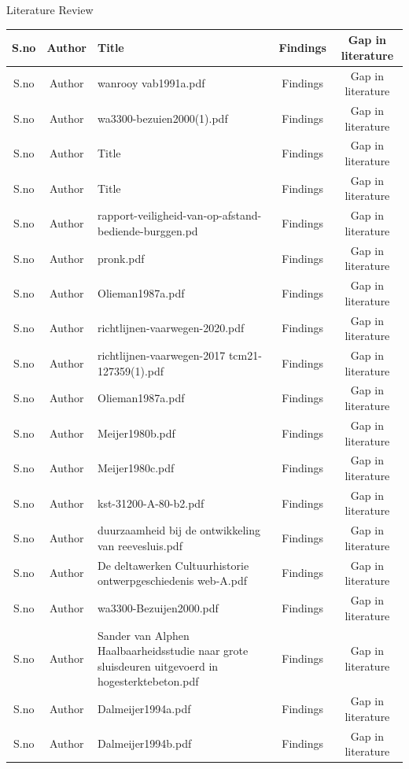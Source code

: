 \begin{frame}{Literature Review}
\begin{table}[htbp]
		\centering
		\begin{tabular}{|c|c|p{2in}|c|c|}\hline
			S.no&Author&Title&Findings&Gap in literature\\\hline
			S.no&Author&wanrooy \textunderscore vab1991a.pdf&Findings&Gap in literature\\\hline
			S.no&Author&wa3300-bezuien2000(1).pdf&Findings&Gap in literature\\\hline
			S.no&Author&Title&Findings&Gap in literature\\\hline
			S.no&Author&Title&Findings&Gap in literature\\\hline
			S.no&Author&rapport-veiligheid-van-op-afstand-bediende-burggen.pd&Findings&Gap in literature\\\hline
			S.no&Author&pronk.pdf&Findings&Gap in literature\\\hline
			S.no&Author&Olieman1987a.pdf&Findings&Gap in literature\\\hline
			S.no&Author&richtlijnen-vaarwegen-2020.pdf&Findings&Gap in literature\\\hline
			S.no&Author&richtlijnen-vaarwegen-2017 \textunderscore tcm21-127359(1).pdf&Findings&Gap in literature\\\hline
			S.no&Author&Olieman1987a.pdf&Findings&Gap in literature\\\hline
			S.no&Author&Meijer1980b.pdf&Findings&Gap in literature\\\hline
			S.no&Author&Meijer1980c.pdf&Findings&Gap in literature\\\hline
			S.no&Author&kst-31200-A-80-b2.pdf&Findings&Gap in literature\\\hline
			S.no&Author&duurzaamheid \textunderscore bij \textunderscore de \textunderscore ontwikkeling \textunderscore van \textunderscore reevesluis.pdf&Findings&Gap in literature\\\hline
			S.no&Author&De \textunderscore deltawerken \textunderscore Cultuurhistorie \textunderscore ontwerpgeschiedenis \textunderscore web-A.pdf&Findings&Gap in literature\\\hline
			S.no&Author&wa3300-Bezuijen2000.pdf&Findings&Gap in literature\\\hline
			S.no&Author&Sander van Alphen Haalbaarheidsstudie naar grote sluisdeuren uitgevoerd in hogesterktebeton.pdf&Findings&Gap in literature\\\hline
			S.no&Author&Dalmeijer1994a.pdf&Findings&Gap in literature\\\hline
			S.no&Author&Dalmeijer1994b.pdf&Findings&Gap in literature\\\hline

\end{tabular}
\end{table}
\end{frame}
